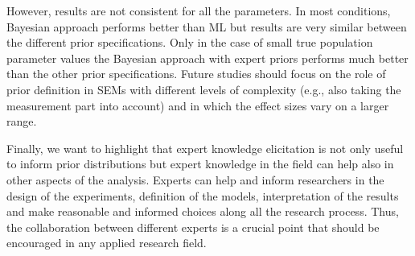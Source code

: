 \documentclass[graybox]{svmult}
\begin{document}
However, results are not consistent for all the parameters. In most conditions, Bayesian approach performs better than ML but results are very similar between the different prior specifications. Only in the case of small true population parameter values the Bayesian approach with expert priors performs much better than the other prior specifications.
Future studies should focus on the role of prior definition in SEMs with different levels of complexity (e.g., also taking the measurement part into account) and in which the effect sizes vary on a larger range.


Finally, we want to highlight that expert knowledge elicitation is not only useful to inform prior distributions but expert knowledge in the field can help also in other aspects of the analysis. Experts can help and inform researchers in the design of the experiments, definition of the models, interpretation of the results and make reasonable and informed choices along all the research process. Thus, the collaboration between different experts is a crucial point that should be encouraged in any applied research field.





%
\end{document}
